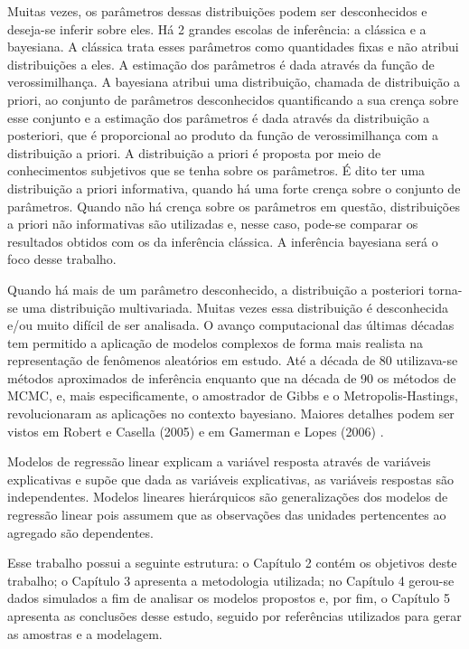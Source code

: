 \documentclass[12pt,a4paper,header]{abnt}
\begin{document}
Muitas vezes, os parâmetros dessas distribuições podem ser desconhecidos e deseja-se inferir sobre eles. Há 2 grandes escolas de inferência: a clássica e a bayesiana. A clássica trata esses parâmetros como quantidades fixas e não atribui distribuições a eles. A estimação dos parâmetros é dada através da função de verossimilhança. A bayesiana atribui uma distribuição, chamada de distribuição a priori, ao conjunto de parâmetros desconhecidos quantificando a sua crença sobre esse conjunto e a estimação dos parâmetros é dada através da distribuição a posteriori, que é  proporcional ao produto da função de verossimilhança com a distribuição a priori. A distribuição a priori é proposta por meio de conhecimentos subjetivos que se tenha sobre os parâmetros. É dito ter uma distribuição a priori informativa, quando há uma forte crença sobre o conjunto de parâmetros. Quando não há crença sobre os parâmetros em questão, distribuições a priori não informativas são utilizadas e, nesse caso, pode-se comparar os resultados obtidos com os da inferência clássica. A inferência bayesiana será o foco desse trabalho.

Quando há mais de um parâmetro desconhecido, a distribuição a posteriori torna-se uma distribuição multivariada. Muitas vezes essa distribuição é desconhecida e/ou muito difícil de ser analisada. O avanço computacional das últimas décadas tem permitido a aplicação de modelos complexos de forma mais realista na representação de fenômenos aleatórios em estudo. Até a década de 80 utilizava-se métodos aproximados de inferência enquanto que na década de 90 os métodos de \ac{MCMC}, e,  mais especificamente, o amostrador de Gibbs e o Metropolis-Hastings, revolucionaram as aplicações no contexto bayesiano. Maiores detalhes podem ser vistos em Robert e Casella (2005) \cite{robert_casella} e em Gamerman e Lopes (2006) \cite{Gamerman06}.

Modelos de regressão linear explicam a variável resposta através de variáveis
explicativas e supõe que dada as variáveis explicativas, as variáveis respostas são
independentes. Modelos lineares hierárquicos são generalizações dos modelos de regressão
linear pois assumem que as observações das unidades pertencentes ao agregado são
dependentes.

Esse trabalho possui a seguinte estrutura: o Capítulo 2 contém os objetivos deste trabalho; o Capítulo 3 apresenta a metodologia utilizada; no Capítulo 4 gerou-se dados simulados a fim de analisar os modelos propostos e, por fim, o Capítulo 5 apresenta as conclusões desse estudo, seguido por referências utilizados para gerar as amostras e a modelagem.
\end{document}
